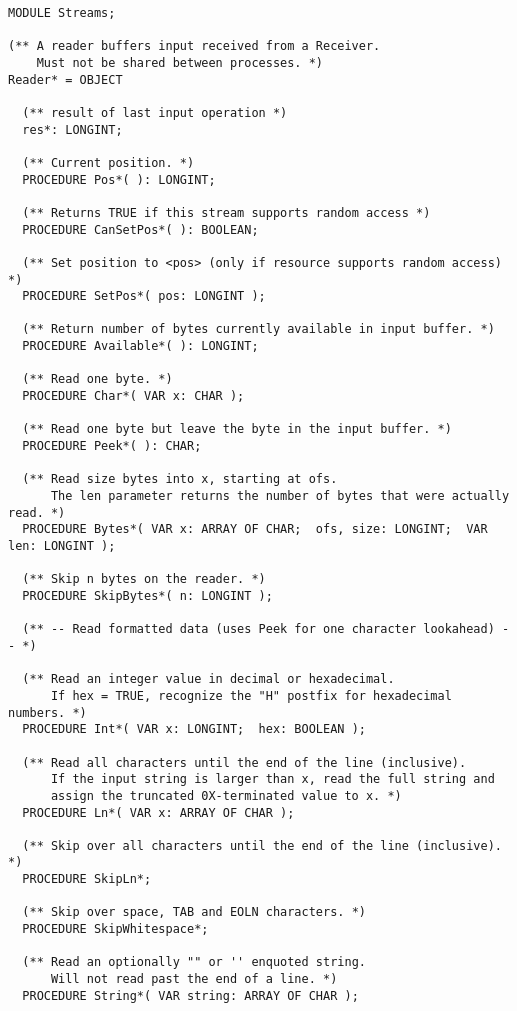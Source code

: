\documentclass[a4paper,11pt]{article}
\begin{document}
\begin{lstlisting}[language=Oberon,frame=none,caption={Simplified Reader and Writer Interface}]
MODULE Streams;

(** A reader buffers input received from a Receiver.
    Must not be shared between processes. *)
Reader* = OBJECT

  (** result of last input operation *)
  res*: LONGINT;
  
  (** Current position. *)
  PROCEDURE Pos*( ): LONGINT;

  (** Returns TRUE if this stream supports random access *)
  PROCEDURE CanSetPos*( ): BOOLEAN;

  (** Set position to <pos> (only if resource supports random access) *)
  PROCEDURE SetPos*( pos: LONGINT );

  (** Return number of bytes currently available in input buffer. *)
  PROCEDURE Available*( ): LONGINT;

  (** Read one byte. *)
  PROCEDURE Char*( VAR x: CHAR );

  (** Read one byte but leave the byte in the input buffer. *)
  PROCEDURE Peek*( ): CHAR;

  (** Read size bytes into x, starting at ofs.
      The len parameter returns the number of bytes that were actually read. *)
  PROCEDURE Bytes*( VAR x: ARRAY OF CHAR;  ofs, size: LONGINT;  VAR len: LONGINT );

  (** Skip n bytes on the reader. *)
  PROCEDURE SkipBytes*( n: LONGINT );

  (** -- Read formatted data (uses Peek for one character lookahead) -- *)

  (** Read an integer value in decimal or hexadecimal.
      If hex = TRUE, recognize the "H" postfix for hexadecimal numbers. *)
  PROCEDURE Int*( VAR x: LONGINT;  hex: BOOLEAN );

  (** Read all characters until the end of the line (inclusive).
      If the input string is larger than x, read the full string and
      assign the truncated 0X-terminated value to x. *)
  PROCEDURE Ln*( VAR x: ARRAY OF CHAR );

  (** Skip over all characters until the end of the line (inclusive). *)
  PROCEDURE SkipLn*;

  (** Skip over space, TAB and EOLN characters. *)
  PROCEDURE SkipWhitespace*;

  (** Read an optionally "" or '' enquoted string.
      Will not read past the end of a line. *)
  PROCEDURE String*( VAR string: ARRAY OF CHAR );


\end{lstlisting}
\end{document}
